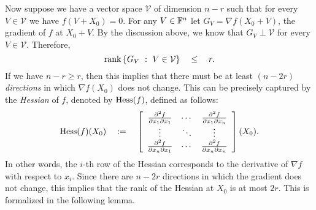 Now suppose we have a vector space $\mathcal{V}$ of dimension $n-r$ such that for every $V \in \mathcal{V}$ we have $f(V + X_0) = 0$. For any $V\in \mathbb{F}^n$ let $G_V = \nabla f (X_0 + V)$, the gradient of $f$ at $X_0 + V$. By the discussion above, we know that $G_V \perp \mathcal{V}$ for every $V\in \mathcal{V}$. Therefore, \[
\operatorname{rank}\left\{{G_V}\ : \ {V \in \mathcal{V}}\right\} \quad \leq \quad r.
\]
If we have $n - r \geq r$, then this implies that there must be at least $(n - 2r)$ \emph{directions} in which $\nabla f (X_0)$ does not change. This can be precisely captured by the \emph{Hessian} of $f$, denoted by $\operatorname{Hess}(f)$, defined as follows:
\[
\operatorname{Hess}(f) (X_0) \quad := \quad \left[
\begin{array}{ccc}
\frac{\partial^2 f}{\partial x_1 \partial x_1} & \cdots & \frac{\partial^2 f}{\partial x_1 \partial x_n}\\
\vdots & \ddots & \vdots \\
\frac{\partial^2 f}{\partial x_n \partial x_1} & \cdots & \frac{\partial^2 f}{\partial x_n \partial x_n}\\
\end{array}\right] (X_0).
\]
In other words, the $i$-th row of the Hessian corresponds to the derivative of $\nabla f$ with respect to $x_i$. Since there are $n-2r$ directions in which the gradient does not change, this implies that the rank of the Hessian at $X_0$ is at most $2r$. This is formalized in the following lemma. 

